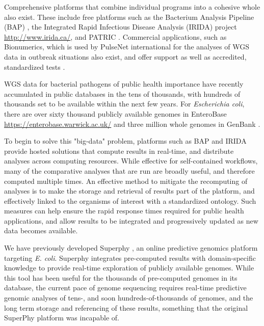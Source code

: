 \documentclass{article}
\begin{document}
Comprehensive platforms that combine individual programs into a cohesive whole also exist. These include free platforms such as the Bacterium Analysis Pipeline (BAP) \cite{thomsen2016bacterial}, the Integrated Rapid Infectious Disease Analysis (IRIDA) project \url{http://www.irida.ca/}, and PATRIC \cite{wattam2013patric}. Commercial applications, such as Bionumerics, which is used by PulseNet international for the analyses of WGS data in outbreak situations also exist, and offer support as well as accredited, standardized tests \cite{swaminathan2001pulsenet}.

WGS data for bacterial pathogens of public health importance have recently accumulated in public databases in the tens of thousands, with hundreds of thousands set to be available within the next few years. For \textit{Escherichia coli}, there are over sixty thousand publicly available genomes in EnteroBase \url{https://enterobase.warwick.ac.uk/} and three million whole genomes in GenBank \cite{doi:10.1093/nar/gks1195}.

To begin to solve this "big-data" problem, platforms such as BAP and IRIDA provide hosted solutions that compute results in real-time, and distribute analyses across computing resources. While effective for self-contained workflows, many of the comparative analyses that are run are broadly useful, and therefore computed multiple times. An effective method to mitigate the recomputing of analyses is to make the storage and retrieval of results part of the platform, and effectively linked to the organisms of interest with a standardized ontology. Such measures can help ensure the rapid response times required for public health applications, and allow results to be integrated and progressively updated as new data becomes available.

We have previously developed Superphy \cite{whiteside2016superphy}, an online predictive genomics platform targeting \textit{E. coli}. Superphy integrates pre-computed results with domain-specific knowledge to provide real-time exploration of publicly available genomes. While this tool has been useful for the thousands of pre-computed genomes in its database, the current pace of genome sequencing requires real-time predictive genomic analyses of tens-, and soon hundreds-of-thousands of genomes, and the long term storage and referencing of these results, something that the original SuperPhy platform was incapable of.
\end{document}
